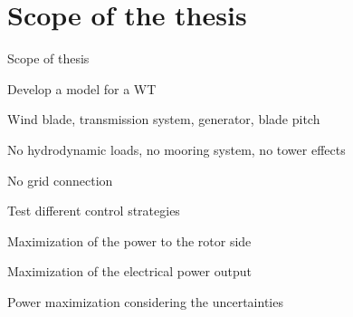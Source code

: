 
\section{Scope of the thesis}
\begin{frame}{Scope of thesis}
  \begin{myitemize}
    \item Develop a model for a WT
    \begin{myitemize}
      \item Wind blade, transmission system, generator, blade pitch
      \item No hydrodynamic loads, no mooring system, no tower effects
      \item No grid connection
    \end{myitemize} 
    
    \item Test different control strategies
    \begin{myitemize}
      \item Maximization of the power to the rotor side
      \item Maximization of the electrical power output
      \item Power maximization considering the uncertainties
    \end{myitemize}
  \end{myitemize}
\end{frame}

                                                    
